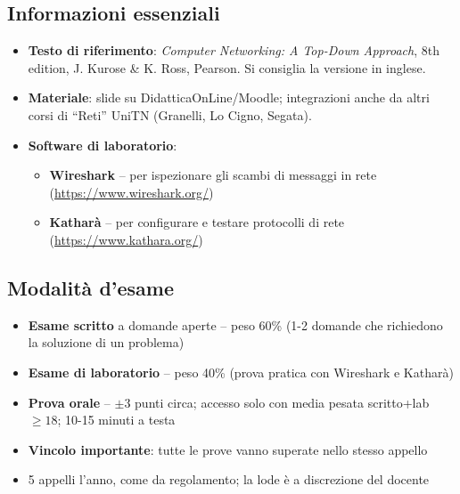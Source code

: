 \documentclass[12pt, a4paper]{article}
\begin{document}
\subsection{Informazioni essenziali}

\begin{itemize}
    \item \textbf{Testo di riferimento}: \textit{Computer Networking: A Top-Down Approach}, 8th edition, J. Kurose \& K. Ross, Pearson. Si consiglia la versione in inglese.
    \item \textbf{Materiale}: slide su DidatticaOnLine/Moodle; integrazioni anche da altri corsi di ``Reti'' UniTN (Granelli, Lo Cigno, Segata).
    \item \textbf{Software di laboratorio}:
    \begin{itemize}
        \item \textbf{Wireshark} -- per ispezionare gli scambi di messaggi in rete (\url{https://www.wireshark.org/})
        \item \textbf{Katharà} -- per configurare e testare protocolli di rete (\url{https://www.kathara.org/})
    \end{itemize}
\end{itemize}

\subsection{Modalità d'esame}

\begin{tcolorbox}[colback=lightergray!10, colframe=tocsec, title=\textbf{Struttura della valutazione}]
\begin{itemize}
    \item \textbf{Esame scritto} a domande aperte -- peso \textcolor{blue!70!black}{60\%} (1-2 domande che richiedono la soluzione di un problema)
    \item \textbf{Esame di laboratorio} -- peso \textcolor{blue!70!black}{40\%} (prova pratica con Wireshark e Katharà)
    \item \textbf{Prova orale} -- $\pm 3$ punti circa; accesso solo con media pesata scritto+lab $\geq 18$; 10-15 minuti a testa
    \item \textcolor{red!80!black}{\textbf{Vincolo importante}}: tutte le prove vanno superate nello stesso appello
    \item 5 appelli l'anno, come da regolamento; la lode è a discrezione del docente
\end{itemize}
\end{tcolorbox}
\end{document}
